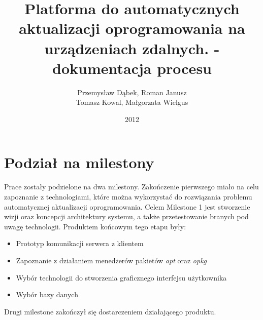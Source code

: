 \documentclass[polish,12pt]{aghthesis} \usepackage[utf8]{inputenc}
\author{Przemysław Dąbek, Roman Janusz\\ Tomasz Kowal, Małgorzata Wielgus}
\title{Platforma do automatycznych aktualizacji oprogramowania na urządzeniach
  zdalnych. - dokumentacja procesu}
\date{2012}
\begin{document}
\maketitle

\section{Podział na milestony}
Prace zostały podzielone na dwa milestony. Zakończenie pierwszego miało na celu zapoznanie z technologiami, które można wykorzystać do rozwiązania problemu automatycznej aktualizacji oprogramowania. Celem Milestone 1 jest stworzenie wizji oraz koncepcji architektury systemu, a także przetestowanie branych pod uwagę technologii. Produktem końcowym tego etapu były:
\begin{itemize}
\item Prototyp komunikacji serwera z klientem
\item Zapoznanie z działaniem menedżerów pakietów \emph{apt} oraz \emph{opkg}
\item Wybór technologii do stworzenia graficznego interfejsu użytkownika
\item Wybór bazy danych
\end{itemize}

Drugi milestone zakończył się dostarczeniem działającego produktu.
\clearpage
\end{document}
